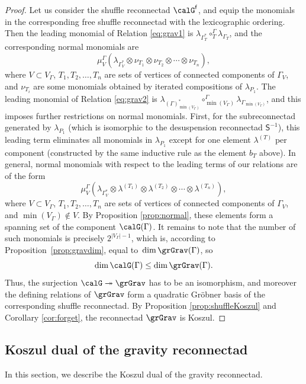 \begin{proof}
Let us consider the shuffle reconnectad $\calG^{\mathsf{f}}$, and equip the monomials in the corresponding free shuffle reconnectad with the lexicographic ordering. Then the leading monomial of Relation \eqref{eq:grav1} is $\lambda_{\Gamma^*_{T}}\circ_T^{\Gamma} \lambda_{\Gamma_{T}}$, and the corresponding normal monomials are
 \[
\mu_V^\Gamma(\lambda_{\Gamma^*_V}\otimes\nu_{T_1}\otimes\nu_{T_2}\otimes\cdots\otimes\nu_{T_n}),
 \]
where $V\subset V_\Gamma$, $T_1,T_2,\ldots,T_n$ are sets of vertices of connected components of $\Gamma_V$, and $\nu_{T_i}$ are some monomials obtained by iterated compositions of $\lambda_{P_1}$. The leading monomial of Relation \eqref{eq:grav2} is $\lambda_{(\Gamma)^*_{\min(V_\Gamma)}} \circ_{\min(V_\Gamma)}^{\Gamma} \lambda_{\Gamma_{\min(V_\Gamma)}}$, and this imposes further restrictions on normal monomials. First, for the subreconnectad generated by $\lambda_{P_1}$ (which is isomorphic to the desuspension reconnectad $\mathsf{S}^{-1}$), this leading term eliminates all monomials in $\lambda_{P_1}$ except for one element $\lambda^{(T)}$ per component (constructed by the same inductive rule as the element $b_T$ above). In general, normal monomials with respect to the leading terms of our relations are of the form
 \[
\mu_V^\Gamma(\lambda_{\Gamma^*_V}\otimes\lambda^{(T_1)}\otimes\lambda^{(T_2)}\otimes\cdots\otimes\lambda^{(T_n)}),
 \]
where $V\subset V_\Gamma$, $T_1,T_2,\ldots,T_n$ are sets of vertices of connected components of $\Gamma_V$, and $\min(V_\Gamma)\notin V$. By Proposition \ref{prop:normal}, these elements form a spanning set of the component $\calG(\Gamma)$. It remains to note that the number of such monomials is precisely $2^{|V_\Gamma|-1}$, which is, according to Proposition~\ref{prop:gravdim}, equal to~$\dim\grGrav(\Gamma)$, so 
 \[
\dim\calG(\Gamma)\le \dim\grGrav(\Gamma).
 \] 
Thus, the surjection $\calG\twoheadrightarrow\grGrav$ has to be an isomorphism, and moreover the defining relations of $\grGrav$ form a quadratic Gr\"obner basis of the corresponding shuffle reconnectad. By Proposition \ref{prop:shuffleKoszul} and Corollary \ref{cor:forget}, the reconnectad $\grGrav$ is Koszul.
\end{proof}

\subsection{Koszul dual of the gravity reconnectad}

In this section, we describe the Koszul dual of the gravity reconnectad. 

